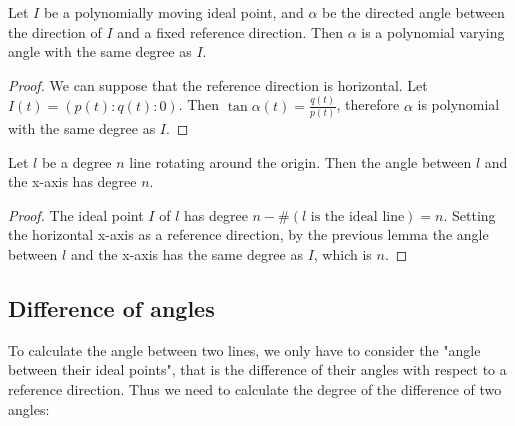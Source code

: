 \documentclass[a4paper]{article}
\begin{document}
\begin{lemma}
    Let $I$ be a polynomially moving ideal point, and $\alpha$ be the directed angle between the direction of $I$ and a fixed reference direction. Then $\alpha$ is a polynomial varying angle with the same degree as $I$. 
\end{lemma}
\begin{proof}
    We can suppose that the reference direction is horizontal.
    Let $I(t)=(p(t):q(t):0)$.
    Then $\tan \alpha(t)=\frac{q(t)}{p(t)}$, therefore $\alpha$ is polynomial with the same degree as $I$.
\end{proof}
\begin{example}
    Let $l$ be a degree $n$ line rotating around the origin. Then the angle between $l$ and the x-axis has degree $n$.
    \begin{proof}
        The ideal point $I$ of $l$ has degree $n-\#(\text{$l$ is the ideal line})=n$. Setting the horizontal x-axis as a reference direction, by the previous lemma the angle between $l$ and the x-axis has the same degree as $I$, which is $n$.
    \end{proof}
\end{example}



\subsection{Difference of angles}

To calculate the angle between two lines, we only have to consider the "angle between their ideal points", that is the difference of their angles with respect to a reference direction. Thus we need to calculate the degree of the difference of two angles:
\end{document}
